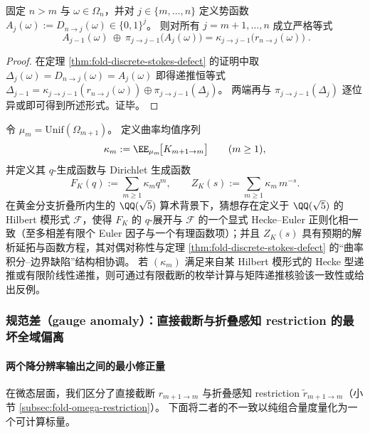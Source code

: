 \begin{proposition}[分辨率条带上的势函数表示]\label{prop:fold-discrete-poincare-band}
固定 \(n>m\) 与 \(\omega\in\Omega_n\)，并对 \(j\in\{m,\dots,n\}\) 定义势函数 \(A_j(\omega):=D_{n\to j}(\omega)\in\{0,1\}^j\)。
则对所有 \(j=m+1,\dots,n\) 成立严格等式
\[
\boxed{\;
A_{j-1}(\omega)\ \oplus\ \pi_{j\to j-1}\!\bigl(A_j(\omega)\bigr)
=\kappa_{j\to j-1}\!\bigl(r_{n\to j}(\omega)\bigr)\; }.
\]
\end{proposition}

\begin{proof}
在定理 \ref{thm:fold-discrete-stokes-defect} 的证明中取 \(\Delta_j(\omega)=D_{n\to j}(\omega)=A_j(\omega)\) 即得递推恒等式
\(
\Delta_{j-1}=\kappa_{j\to j-1}(r_{n\to j}(\omega))\oplus \pi_{j\to j-1}(\Delta_j)
\)。
两端再与 \(\pi_{j\to j-1}(\Delta_j)\) 逐位异或即可得到所述形式。证毕。
\end{proof}

\begin{conjecture}\label{conj:fold-curvature-hilbert-modularity}
令 \(\mu_m=\mathrm{Unif}(\Omega_{m+1})\)。
定义曲率均值序列
\[
\kappa_m:=\EE_{\mu_m}\!\bigl[K_{m+1\to m}\bigr]\qquad(m\ge 1),
\]
并定义其 \(q\)-生成函数与 Dirichlet 生成函数
\[
F_K(q):=\sum_{m\ge 1}\kappa_m q^m,\qquad
Z_K(s):=\sum_{m\ge 1}\kappa_m\,m^{-s}.
\]
在黄金分支折叠所内生的 \(\QQ(\sqrt5)\) 算术背景下，猜想存在定义于 \(\QQ(\sqrt5)\) 的 Hilbert 模形式 \(\mathcal F\)，使得 \(F_K\) 的 \(q\)-展开与 \(\mathcal F\) 的一个显式 Hecke--Euler 正则化相一致（至多相差有限个 Euler 因子与一个有理函数项）；并且 \(Z_K(s)\) 具有预期的解析延拓与函数方程，其对偶对称性与定理 \ref{thm:fold-discrete-stokes-defect} 的“曲率积分--边界缺陷”结构相协调。
若 \((\kappa_m)\) 满足来自某 Hilbert 模形式的 Hecke 型递推或有限阶线性递推，则可通过有限截断的枚举计算与矩阵递推核验该一致性或给出反例。
\end{conjecture}

\subsubsection{规范差（gauge anomaly）：直接截断与折叠感知 restriction 的最坏全域偏离}\label{subsec:fold-gauge-anomaly}
\paragraph{两个降分辨率输出之间的最小修正量}
在微态层面，我们区分了直接截断 \(r_{m+1\to m}\) 与折叠感知 restriction \(\widetilde r_{m+1\to m}\)（小节 \ref{subsec:fold-omega-restriction}）。
下面将二者的不一致以纯组合量度量化为一个可计算标量。


